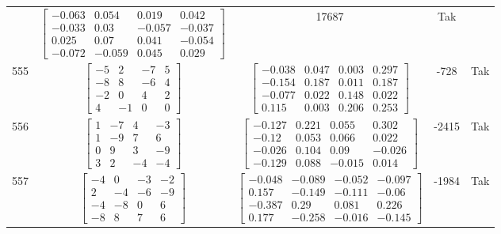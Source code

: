 \documentclass[a4paper,12pt]{article}
\begin{document}
\begin{tabular}{c c c c c}
&
$\begin{bmatrix} -0.063 & 0.054 & 0.019 & 0.042 \\ -0.033 & 0.03 & -0.057 & -0.037 \\ 0.025 & 0.07 & 0.041 & -0.054 \\ -0.072 & -0.059 & 0.045 & 0.029 \end{bmatrix}$
&
17687
&
Tak
\\
555
&
$\begin{bmatrix} -5 & 2 & -7 & 5 \\ -8 & 8 & -6 & 4 \\ -2 & 0 & 4 & 2 \\ 4 & -1 & 0 & 0 \end{bmatrix}$
&
$\begin{bmatrix} -0.038 & 0.047 & 0.003 & 0.297 \\ -0.154 & 0.187 & 0.011 & 0.187 \\ -0.077 & 0.022 & 0.148 & 0.022 \\ 0.115 & 0.003 & 0.206 & 0.253 \end{bmatrix}$
&
-728
&
Tak
\\
556
&
$\begin{bmatrix} 1 & -7 & 4 & -3 \\ 1 & -9 & 7 & 6 \\ 0 & 9 & 3 & -9 \\ 3 & 2 & -4 & -4 \end{bmatrix}$
&
$\begin{bmatrix} -0.127 & 0.221 & 0.055 & 0.302 \\ -0.12 & 0.053 & 0.066 & 0.022 \\ -0.026 & 0.104 & 0.09 & -0.026 \\ -0.129 & 0.088 & -0.015 & 0.014 \end{bmatrix}$
&
-2415
&
Tak
\\
557
&
$\begin{bmatrix} -4 & 0 & -3 & -2 \\ 2 & -4 & -6 & -9 \\ -4 & -8 & 0 & 6 \\ -8 & 8 & 7 & 6 \end{bmatrix}$
&
$\begin{bmatrix} -0.048 & -0.089 & -0.052 & -0.097 \\ 0.157 & -0.149 & -0.111 & -0.06 \\ -0.387 & 0.29 & 0.081 & 0.226 \\ 0.177 & -0.258 & -0.016 & -0.145 \end{bmatrix}$
&
-1984
&
Tak
\\

\end{tabular}
\end{document}
